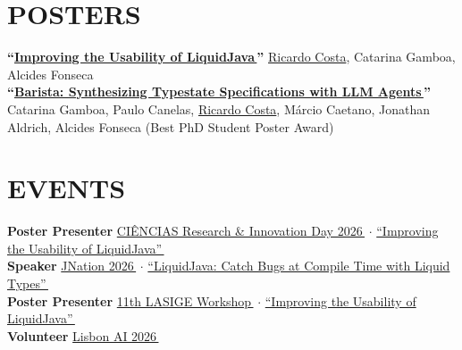 \documentclass[letterpaper,11pt]{article}
\let\oldhref\href
\renewcommand{\href}[2]{\oldhref{#1}{#2\,{\color{dark-grey}\scriptsize\faLink}}}
\begin{document}
\section{POSTERS}
 \begin{itemize}[leftmargin=0in, label={}]
    \small{\item{
      \textbf{``\href{https://rcosta358.github.io/liquidjava-poster.pdf}{Improving the Usability of LiquidJava}''} \textbar{} {\underline{Ricardo Costa}, Catarina Gamboa, Alcides Fonseca}\vspace{2pt} \\
      \textbf{``\href{https://rcosta358.github.io/barista-poster.pdf}{Barista: Synthesizing Typestate Specifications with LLM Agents}''} \textbar{} {Catarina Gamboa, Paulo Canelas, \underline{Ricardo Costa}, Márcio Caetano, Jonathan Aldrich, Alcides Fonseca (Best PhD Student Poster Award)}
    }}
\end{itemize}


\section{EVENTS}
 \begin{itemize}[leftmargin=0in, label={}]
    \small{\item{
      \textbf{Poster Presenter} \textbar{} \href{https://ciencias.ulisboa.pt/ciencias-research-innovation-day-2026-poster-session}{CIÊNCIAS Research \& Innovation Day 2026} $\cdot$ \href{https://rcosta358.github.io/liquidjava-poster.pdf}{``Improving the Usability of LiquidJava''} \vspace{2pt} \\
      \textbf{Speaker} \textbar{} \href{https://jnation.pt}{JNation 2026} $\cdot$ \href{https://www.youtube.com/watch?v=jEA6rN75Q5U}{``LiquidJava: Catch Bugs at Compile Time with Liquid Types''} \vspace{2pt} \\
      \textbf{Poster Presenter} \textbar{} \href{https://lasige.pt}{11th LASIGE Workshop} $\cdot$ \href{https://rcosta358.github.io/liquidjava-poster.pdf}{``Improving the Usability of LiquidJava''} \vspace{2pt} \\
      \textbf{Volunteer} \textbar{} \href{https://lisbonai.org}{Lisbon AI 2026}
    }}
\end{itemize}

\end{document}
